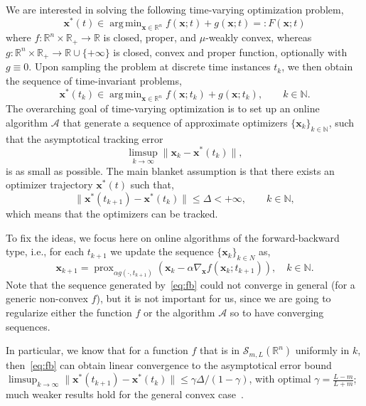 \documentclass{article}
\DeclareMathOperator*{\argmin}{arg\,min}
\DeclareMathOperator{\prox}{prox}
\newcommand{\N}{\mathbb{N}}
\newcommand{\R}{\mathbb{R}}
\newcommand{\x}{\mathbold{x}}
\begin{document}
We are interested in solving the following time-varying optimization problem,
\begin{equation}\label{eq:continuous-time-problem}
	\x^*(t) \in \argmin_{\x \in \R^n} f(\x; t) + g(\x; t) =: F(\x; t)
\end{equation}
where $f : \R^n \times \R_+ \to \R$ is closed, proper, and $\mu$-weakly convex, whereas $g : \R^n \times \R_+ \to \R \cup \{ +\infty \}$ is closed, convex and proper function, optionally with $g \equiv 0$. Upon sampling the problem at discrete time instances $t_k$, we then obtain the sequence of time-invariant problems,
\begin{equation}\label{eq:base-problem}
	\x^*(t_k) \in \argmin_{\x \in \R^n} f(\x; t_k) + g(\x; t_k), \qquad k \in \N. 
\end{equation}
The overarching goal of time-varying optimization is to set up an online algorithm $\mathcal{A}$ that generate a sequence of approximate optimizers $\{\x_k\}_{k\in \N}$, such that the asymptotical tracking error
\begin{equation}
\limsup_{k \to \infty}  \|\x_k - \x^*(t_k)\|,
\end{equation}
is as small as possible. The main blanket assumption is that there exists an optimizer trajectory $\x^*(t)$ such that,
\begin{equation}
\|\x^*(t_{k+1}) - \x^*(t_k)\| \leq \Delta < +\infty, \qquad k \in \N,
\end{equation}
which means that the optimizers can be tracked. 

To fix the ideas, we focus here on online algorithms of the forward-backward type, i.e., for each $t_{k+1}$ we update the sequence $\{\x_k\}_{k \in N}$ as,
\begin{equation}\label{eq:fb}
\x_{k+1} = \prox_{\alpha g(\cdot, t_{k+1})} (\x_{k} - \alpha \nabla_{\x} f(\x_{k}; t_{k+1})), \quad k \in \N.
\end{equation}
Note that the sequence generated by~\eqref{eq:fb} could not converge in general (for a generic non-convex $f$), but it is not important for us, since we are going to regularize either the function $f$ or the algorithm $\mathcal{A}$ so to have converging sequences. 

In particular, we know that for a function $f$ that is in $\mathcal{S}_{m,L}(\R^n)$ uniformly in $k$, then~\eqref{eq:fb} can obtain linear convergence to the asymptotical error bound $\limsup_{k\to\infty} \|\x^*(t_{k+1}) - \x^*(t_k)\| \leq \gamma\Delta/(1-\gamma)$, with optimal $\gamma = \frac{L-m}{L+m}$; much weaker results hold for the general convex case~\cite{Simonetto20XX}. 
\end{document}
